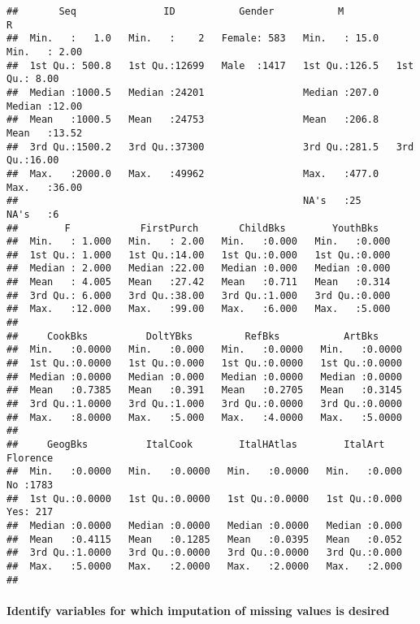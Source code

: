 \documentclass[
]{article}
\begin{document}
\begin{verbatim}
##       Seq               ID           Gender           M               R        
##  Min.   :   1.0   Min.   :    2   Female: 583   Min.   : 15.0   Min.   : 2.00  
##  1st Qu.: 500.8   1st Qu.:12699   Male  :1417   1st Qu.:126.5   1st Qu.: 8.00  
##  Median :1000.5   Median :24201                 Median :207.0   Median :12.00  
##  Mean   :1000.5   Mean   :24753                 Mean   :206.8   Mean   :13.52  
##  3rd Qu.:1500.2   3rd Qu.:37300                 3rd Qu.:281.5   3rd Qu.:16.00  
##  Max.   :2000.0   Max.   :49962                 Max.   :477.0   Max.   :36.00  
##                                                 NA's   :25      NA's   :6      
##        F            FirstPurch       ChildBks        YouthBks    
##  Min.   : 1.000   Min.   : 2.00   Min.   :0.000   Min.   :0.000  
##  1st Qu.: 1.000   1st Qu.:14.00   1st Qu.:0.000   1st Qu.:0.000  
##  Median : 2.000   Median :22.00   Median :0.000   Median :0.000  
##  Mean   : 4.005   Mean   :27.42   Mean   :0.711   Mean   :0.314  
##  3rd Qu.: 6.000   3rd Qu.:38.00   3rd Qu.:1.000   3rd Qu.:0.000  
##  Max.   :12.000   Max.   :99.00   Max.   :6.000   Max.   :5.000  
##                                                                  
##     CookBks          DoltYBks         RefBks           ArtBks      
##  Min.   :0.0000   Min.   :0.000   Min.   :0.0000   Min.   :0.0000  
##  1st Qu.:0.0000   1st Qu.:0.000   1st Qu.:0.0000   1st Qu.:0.0000  
##  Median :0.0000   Median :0.000   Median :0.0000   Median :0.0000  
##  Mean   :0.7385   Mean   :0.391   Mean   :0.2705   Mean   :0.3145  
##  3rd Qu.:1.0000   3rd Qu.:1.000   3rd Qu.:0.0000   3rd Qu.:0.0000  
##  Max.   :8.0000   Max.   :5.000   Max.   :4.0000   Max.   :5.0000  
##                                                                    
##     GeogBks          ItalCook        ItalHAtlas        ItalArt      Florence  
##  Min.   :0.0000   Min.   :0.0000   Min.   :0.0000   Min.   :0.000   No :1783  
##  1st Qu.:0.0000   1st Qu.:0.0000   1st Qu.:0.0000   1st Qu.:0.000   Yes: 217  
##  Median :0.0000   Median :0.0000   Median :0.0000   Median :0.000             
##  Mean   :0.4115   Mean   :0.1285   Mean   :0.0395   Mean   :0.052             
##  3rd Qu.:1.0000   3rd Qu.:0.0000   3rd Qu.:0.0000   3rd Qu.:0.000             
##  Max.   :5.0000   Max.   :2.0000   Max.   :2.0000   Max.   :2.000             
## 
\end{verbatim}

\paragraph{Identify variables for which imputation of missing values is
desired}\label{identify-variables-for-which-imputation-of-missing-values-is-desired}
\end{document}
